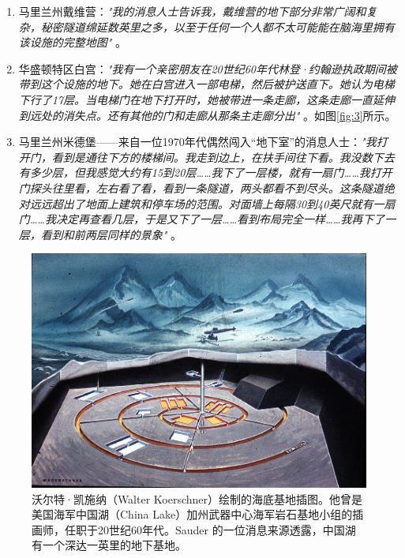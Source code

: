 \documentclass[10pt,twocolumn,letterpaper]{article}
\begin{document}
\begin{flushleft}
\begin{enumerate}
    \item 马里兰州戴维营：\textit{"我的消息人士告诉我，戴维营的地下部分非常广阔和复杂，秘密隧道绵延数英里之多，以至于任何一个人都不太可能能在脑海里拥有该设施的完整地图"} \cite{22}。
    \item 华盛顿特区白宫：\textit{"我有一个亲密朋友在20世纪60年代林登·约翰逊执政期间被带到这个设施的地下。她在白宫进入一部电梯，然后被护送直下。她认为电梯下行了17层。当电梯门在地下打开时，她被带进一条走廊，这条走廊一直延伸到远处的消失点。还有其他的门和走廊从那条主走廊分出"} \cite{22}。如图\ref{fig:3}所示。
    \item 马里兰州米德堡——来自一位1970年代偶然闯入“地下室”的消息人士：\textit{"我打开门，看到是通往下方的楼梯间。我走到边上，在扶手间往下看。我没数下去有多少层，但我感觉大约有15到20层……我下了一层楼，就有一扇门……我打开门探头往里看，左右看了看，看到一条隧道，两头都看不到尽头。这条隧道绝对远远超出了地面上建筑和停车场的范围。对面墙上每隔30到40英尺就有一扇门……我决定再查看几层，于是又下了一层……看到布局完全一样……我再下了一层，看到和前两层同样的景象"} \cite{22}。
\end{enumerate}
\end{flushleft}

\begin{figure}[t]

\begin{center}
   \includegraphics[width=1\linewidth]{undersea.jpg}
\end{center}
   \caption{沃尔特·凯施纳（Walter Koerschner）绘制的海底基地插图。他曾是美国海军中国湖（China Lake）加州武器中心海军岩石基地小组的插画师，任职于20世纪60年代。Sauder 的一位消息来源透露，中国湖有一个深达一英里的地下基地\cite{22,23}。}
\label{fig:5}
\label{fig:onecol}
\end{figure}
\end{document}
